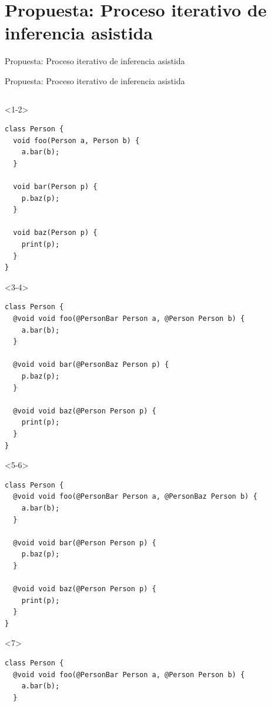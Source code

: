 \documentclass[aspectratio=169,10pt]{beamer}
\begin{document}
\section{Propuesta: Proceso iterativo de inferencia asistida}
\begin{frame}[fragile]{Propuesta: Proceso iterativo de inferencia asistida}
	\begin{itemize}
	\end{itemize}
\end{frame}
\begin{frame}[fragile]{Propuesta: Proceso iterativo de inferencia asistida}

    \begin{columns}
      \begin{column}{0.5\textwidth}
				\begin{onlyenv}<1-2>
					\only<2-|handout:0>{\stepcounter{framenumber}}
    \begin{lstlisting}
class Person {
  void foo(Person a, Person b) {
    a.bar(b);
  }

  void bar(Person p) {
    p.baz(p);
  }

  void baz(Person p) {
    print(p);
  }
}
\end{lstlisting}
\end{onlyenv}
\begin{onlyenv}<3-4>
\begin{lstlisting}
class Person {
  @void void foo(@PersonBar Person a, @Person Person b) {
    a.bar(b);
  }

  @void void bar(@PersonBaz Person p) {
    p.baz(p);
  }

  @void void baz(@Person Person p) {
    print(p);
  }
}
\end{lstlisting}
\end{onlyenv}
\begin{onlyenv}<5-6>
\begin{lstlisting}
class Person {
  @void void foo(@PersonBar Person a, @PersonBaz Person b) {
    a.bar(b);
  }

  @void void bar(@Person Person p) {
    p.baz(p);
  }

  @void void baz(@Person Person p) {
    print(p);
  }
}
\end{lstlisting}
\end{onlyenv}
\begin{onlyenv}<7>
\begin{lstlisting}
class Person {
  @void void foo(@PersonBar Person a, @Person Person b) {
    a.bar(b);
  }


\end{lstlisting}
\end{onlyenv}
\end{column}
\end{columns}
\end{frame}
\end{document}
